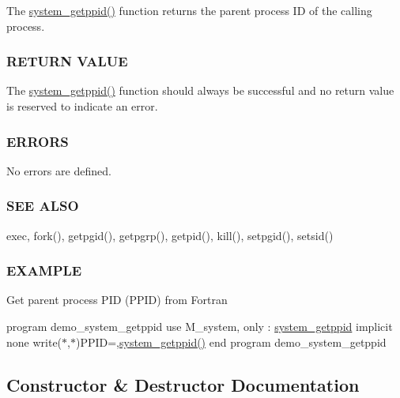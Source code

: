 The \mbox{\hyperlink{interfacem__system_1_1system__getppid_af6e12ecb746ff59fbe323d9364db41b0}{system\+\_\+getppid()}} function returns the parent process ID of the calling process.

\subsubsection*{R\+E\+T\+U\+RN V\+A\+L\+UE}

The \mbox{\hyperlink{interfacem__system_1_1system__getppid_af6e12ecb746ff59fbe323d9364db41b0}{system\+\_\+getppid()}} function should always be successful and no return value is reserved to indicate an error.

\subsubsection*{E\+R\+R\+O\+RS}

No errors are defined.

\subsubsection*{S\+EE A\+L\+SO}

exec, fork(), getpgid(), getpgrp(), getpid(), kill(), setpgid(), setsid()

\subsubsection*{E\+X\+A\+M\+P\+LE}

Get parent process P\+ID (P\+P\+ID) from Fortran

program demo\+\_\+system\+\_\+getppid use M\+\_\+system, only \+: \mbox{\hyperlink{interfacem__system_1_1system__getppid}{system\+\_\+getppid}} implicit none write($\ast$,$\ast$)\textquotesingle{}P\+P\+ID=\textquotesingle{},\mbox{\hyperlink{interfacem__system_1_1system__getppid_af6e12ecb746ff59fbe323d9364db41b0}{system\+\_\+getppid()}} end program demo\+\_\+system\+\_\+getppid 

\subsection{Constructor \& Destructor Documentation}
\mbox{\label{interfacem__system_1_1system__getppid_af6e12ecb746ff59fbe323d9364db41b0}} 

